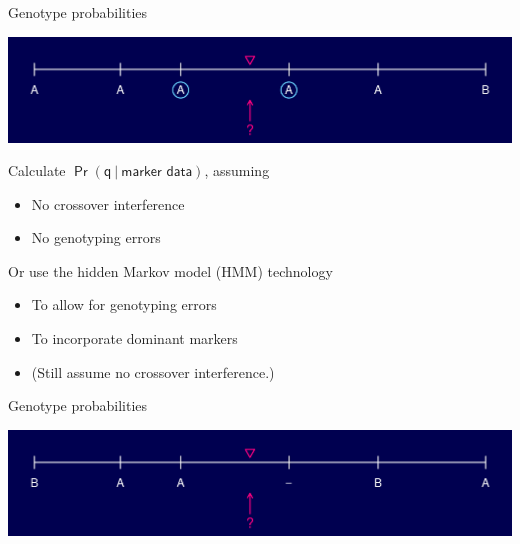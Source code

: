 \documentclass[12pt]{article}
\newcommand{\headsize}{\fontsize{35}{35} \selectfont}
\newcommand{\smallersize}{\fontsize{20}{25} \selectfont}
\begin{document}
\newpage

\addtocounter{page}{-1}

\headsize \color{myyellow}
\hfill \begin{minipage}{5.75in}
\centering
Genotype probabilities
\end{minipage}

\vspace{15mm}

\centerline{\includegraphics{FigsA/genoprob2.pdf}}

\vspace{15mm}

\hfill
\begin{minipage}{10in}
\color{mywhite} \smallersize
Calculate {\color{myblue} $\mathsf{\Pr(q \ | \ \text{marker data})}$}, assuming
\begin{itemize}
\item No crossover interference
\item No genotyping errors
\end{itemize}

\vspace{10mm}

Or use the {\color{mypink} hidden Markov model (HMM)} technology
\begin{itemize}
\item To allow for genotyping errors
\item To incorporate dominant markers
\item {\color{myblue} (Still assume no crossover interference.)}
\end{itemize}
\end{minipage}

\newpage

\addtocounter{page}{-1}

\headsize \color{myyellow}
\hfill \begin{minipage}{5.75in}
\centering
Genotype probabilities
\end{minipage}

\vspace{15mm}

\centerline{\includegraphics{FigsA/genoprob3.pdf}}
\end{document}
